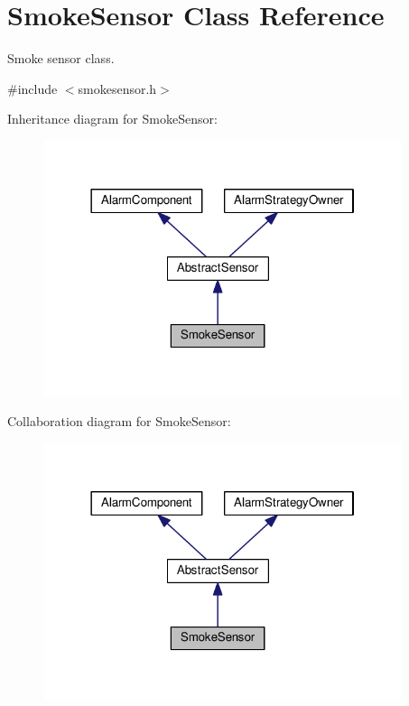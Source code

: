 \hypertarget{classSmokeSensor}{}\section{Smoke\+Sensor Class Reference}
\label{classSmokeSensor}


Smoke sensor class.  




{\ttfamily \#include $<$smokesensor.\+h$>$}



Inheritance diagram for Smoke\+Sensor\+:\nopagebreak
\begin{figure}[H]
\begin{center}
\leavevmode
\includegraphics[width=298pt]{classSmokeSensor__inherit__graph}
\end{center}
\end{figure}


Collaboration diagram for Smoke\+Sensor\+:\nopagebreak
\begin{figure}[H]
\begin{center}
\leavevmode
\includegraphics[width=298pt]{classSmokeSensor__coll__graph}
\end{center}
\end{figure}
